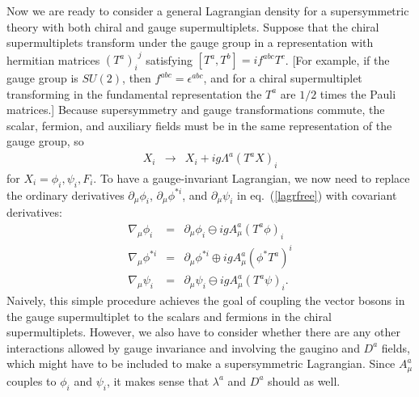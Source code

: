 \documentclass[11pt]{article}
\def\BDplus{+}
\def\BDminus{-}
\def\BDplus{-}
\def\BDminus{+}
\def\BDplus{\oplus}
\def\BDminus{\ominus}
\def\BDplus{\ominus}
\def\BDminus{\oplus}
\def\beq{\begin{eqnarray}}
\def\eeq{\end{eqnarray}}
\begin{document}
Now we are ready to consider a general Lagrangian density for a
supersymmetric theory with both chiral and gauge supermultiplets. Suppose
that the chiral supermultiplets transform under the gauge group in a
representation with hermitian matrices ${(T^a)_i}^j$ satisfying $[T^a,T^b]
=i f^{abc} T^c$. [For example, if the gauge group is $SU(2)$, then
$f^{abc} = \epsilon^{abc}$, and 
for a chiral supermultiplet transforming in the fundamental
representation the $T^a$ are $1/2$ times the Pauli
matrices.] Because supersymmetry and gauge transformations commute,
the scalar, fermion, and auxiliary fields must be in the same
representation of the gauge group, so
\beq
X_i &\rightarrow& X_i + ig \Lambda^a (T^a X)_i
\eeq
for $X_i = \phi_i,\psi_i,F_i$.  To have a gauge-invariant Lagrangian, we
now need to replace the ordinary derivatives $\partial_\mu \phi_i$,
$\partial_\mu \phi^{*i}$, and $\partial_\mu \psi_i$ 
in eq.~(\ref{lagrfree}) with covariant derivatives:
\beq
\nabla_\mu \phi_i &=& \partial_\mu \phi_i \BDplus i g A^a_\mu (T^a\phi)_i
\label{ordtocovphi}
\\
\nabla_\mu \phi^{*i} &=& \partial_\mu \phi^{*i} \BDminus i g A^a_\mu (\phi^* T^a)^i
\\
\nabla_\mu \psi_i &=& \partial_\mu \psi_i \BDplus i g A^a_\mu (T^a\psi)_i .
\label{ordtocovpsi}
\eeq
Naively, this simple procedure achieves the goal of coupling the vector
bosons in the gauge supermultiplet to the scalars and fermions in the
chiral supermultiplets. However, we also have to consider whether there
are any other interactions allowed by gauge invariance and involving the
gaugino and $D^a$ fields, which might have to be included to make a
supersymmetric Lagrangian. Since $A^a_\mu$ couples to $\phi_i$ and
$\psi_i$, it makes sense that $\lambda^a$ and $D^a$ should as well. 
\end{document}
